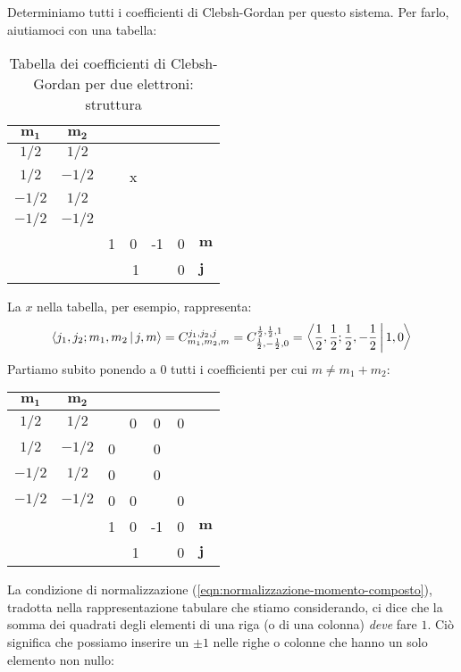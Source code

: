 \documentclass[../../FisicaTeorica.tex]{subfiles}
\begin{document}
Determiniamo tutti i coefficienti di Clebsh-Gordan per questo sistema. Per farlo, aiutiamoci con una tabella:
\begin{table}[H]
\centering
\begin{tabular}{@{}cccccc|l@{}}
\toprule
$\bm{m_1}$ & \multicolumn{1}{c|}{$\bm{m_2}$} &  &  &  &  &  \\ \midrule
$1/2$ & \multicolumn{1}{c|}{$1/2$} &  &  &  &  &  \\
$1/2$ & \multicolumn{1}{c|}{$-1/2$} &  & x &  &  &  \\
$-1/2$ & \multicolumn{1}{c|}{$1/2$} &  &  &  &  &  \\
$-1/2$ & \multicolumn{1}{c|}{$-1/2$} &  &  &  &  &  \\ \midrule
 &  & 1 & 0 & -1 & 0 & $\bm{m}$ \\
 &  & \multicolumn{3}{c}{1} & 0 & $\bm{j}$ \\ \bottomrule
\end{tabular}
\caption{Tabella dei coefficienti di Clebsh-Gordan per due elettroni: struttura}
\label{tab:clebsh-Gordan-1}
\end{table}
La $x$ nella tabella, per esempio, rappresenta:
\begin{align*}
\Braket{j_1, j_2; m_1, m_2|j,m}=
C^{j_1, j_2, j}_{m_1, m_2, m} = C^{\frac{1}{2},\frac{1}{2},1}_{\frac{1}{2}, -\frac{1}{2},0} = \Braket{\frac{1}{2}, \frac{1}{2}; \frac{1}{2},-\frac{1}{2}|1,0}
\end{align*}
Partiamo subito ponendo a $0$ tutti i coefficienti per cui $m\neq m_1+m_2$:
\begin{table}[H]
\centering
\begin{tabular}{@{}cccccc|l@{}}
\toprule
$\bm{m_1}$ & \multicolumn{1}{c|}{$\bm{m_2}$} &  &  &  &  &  \\ \midrule
$1/2$ & \multicolumn{1}{c|}{$1/2$} &  & 0 & 0 & 0 &  \\
$1/2$ & \multicolumn{1}{c|}{$-1/2$} & 0  &  & 0 &  &  \\
$-1/2$ & \multicolumn{1}{c|}{$1/2$} & 0 &  & 0 &  &  \\
$-1/2$ & \multicolumn{1}{c|}{$-1/2$} & 0 & 0 &  & 0 &  \\ \midrule
 &  & 1 & 0 & -1 & 0 & $\bm{m}$ \\
 &  & \multicolumn{3}{c}{1} & 0 & $\bm{j}$ \\ \bottomrule
\end{tabular}
\label{tab:clebsh-Gordan-2}
\end{table}
La condizione di normalizzazione (\ref{eqn:normalizzazione-momento-composto}), tradotta nella rappresentazione tabulare che stiamo considerando, ci dice che la somma dei quadrati degli elementi di una riga (o di una colonna) \textit{deve} fare $1$. Ciò significa che possiamo inserire un $\pm 1$ nelle righe o colonne che hanno un solo elemento non nullo:
\end{document}
